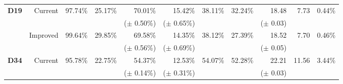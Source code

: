 \begin{tabular}{lrrrrrrrrrr}
\midrule
\multirow{4}{*}{\textbf{D19}} & \multirow{2}{*}{Current}  & \multirow{2}{*}{97.74\%}                      & \multirow{2}{*}{25.17\%}                        & 70.01\%                           & 15.42\%                              & \multirow{2}{*}{38.11\%}            & \multirow{2}{*}{32.24\%}              & 18.48                                     & \multirow{2}{*}{7.73}                       & \multirow{2}{*}{0.44\%} \\
                              &                           &                                               &                                                 & ($\pm$ 0.50\%)                    & ($\pm$ 0.65\%)                       &                                     &                                       & ($\pm$ 0.03)                              &                                             &                         \\[2mm]
                              & \multirow{2}{*}{Improved} & \multirow{2}{*}{99.64\%}                      & \multirow{2}{*}{29.85\%}                        & 69.58\%                           & 14.35\%                              & \multirow{2}{*}{38.12\%}            & \multirow{2}{*}{27.39\%}              & 18.52                                     & \multirow{2}{*}{7.70}                       & \multirow{2}{*}{0.46\%} \\
                              &                           &                                               &                                                 & ($\pm$ 0.56\%)                    & ($\pm$ 0.69\%)                       &                                     &                                       & ($\pm$ 0.05)                              &                                             &                         \\
\midrule
\multirow{4}{*}{\textbf{D34}} & \multirow{2}{*}{Current}  & \multirow{2}{*}{95.78\%}                      & \multirow{2}{*}{22.75\%}                        & 54.37\%                           & 12.53\%                              & \multirow{2}{*}{54.07\%}            & \multirow{2}{*}{52.28\%}              & 22.21                                     & \multirow{2}{*}{11.56}                      & \multirow{2}{*}{3.44\%} \\
                              &                           &                                               &                                                 & ($\pm$ 0.14\%)                    & ($\pm$ 0.31\%)                       &                                     &                                       & ($\pm$ 0.03)                              &                                             &                         \\[2mm]

\end{tabular}
